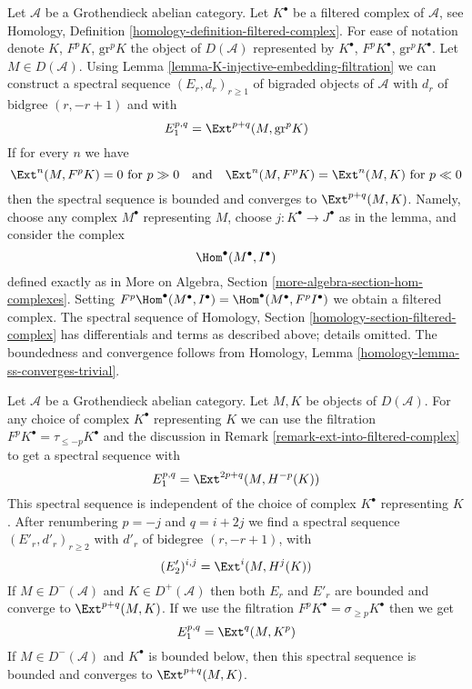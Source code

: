 \begin{remark}
\label{remark-ext-into-filtered-complex}
Let $\mathcal{A}$ be a Grothendieck abelian category.
Let $K^\bullet$ be a filtered complex of $\mathcal{A}$, see
Homology, Definition \ref{homology-definition-filtered-complex}.
For ease of notation denote $K$, $F^pK$, $\text{gr}^pK$ the
object of $D(\mathcal{A})$ represented by $K^\bullet$,
$F^pK^\bullet$, $\text{gr}^pK^\bullet$. Let $M \in D(\mathcal{A})$.
Using Lemma \ref{lemma-K-injective-embedding-filtration}
we can construct a spectral sequence $(E_r, d_r)_{r \geq 1}$
of bigraded objects of $\mathcal{A}$ with $d_r$ of bidgree
$(r, -r + 1)$ and
with
$$
E_1^{p, q} = \Ext^{p + q}(M, \text{gr}^pK)
$$
If for every $n$ we have
$$
\Ext^n(M, F^pK) = 0 \text{ for } p \gg 0
\quad\text{and}\quad
\Ext^n(M, F^pK) = \Ext^n(M, K) \text{ for } p \ll 0
$$
then the spectral sequence is bounded and converges to $\Ext^{p + q}(M, K)$.
Namely, choose any complex $M^\bullet$ representing $M$, choose
$j : K^\bullet \to J^\bullet$ as in the lemma, and consider the complex
$$
\Hom^\bullet(M^\bullet, I^\bullet)
$$
defined exactly as in
More on Algebra, Section \ref{more-algebra-section-hom-complexes}.
Setting $F^p\Hom^\bullet(M^\bullet, I^\bullet) =
\Hom^\bullet(M^\bullet, F^pI^\bullet)$ we obtain a filtered complex.
The spectral sequence of
Homology, Section \ref{homology-section-filtered-complex}
has differentials and terms as described above; details omitted.
The boundedness and convergence follows from
Homology, Lemma \ref{homology-lemma-ss-converges-trivial}.
\end{remark}

\begin{remark}
\label{remark-spectral-sequences-ext}
Let $\mathcal{A}$ be a Grothendieck abelian category.
Let $M, K$ be objects of $D(\mathcal{A})$.
For any choice of complex $K^\bullet$ representing $K$ we
can use the filtration $F^pK^\bullet = \tau_{\leq -p}K^\bullet$
and the discussion in Remark \ref{remark-ext-into-filtered-complex}
to get a spectral sequence with
$$
E_1^{p, q} = \Ext^{2p + q}(M, H^{-p}(K))
$$
This spectral sequence is independent of the choice of
complex $K^\bullet$ representing $K$. After renumbering
$p = -j$ and $q = i + 2j$ we find a spectral sequence
$(E'_r, d'_r)_{r \geq 2}$ with $d'_r$ of bidegree $(r, -r + 1)$, with
$$
(E'_2)^{i, j} = \Ext^i(M, H^j(K))
$$
If $M \in D^-(\mathcal{A})$ and $K \in D^+(\mathcal{A})$ then
both $E_r$ and $E'_r$ are bounded and converge to $\Ext^{p + q}(M, K)$.
If we use the filtration $F^pK^\bullet = \sigma_{\geq p}K^\bullet$
then we get
$$
E_1^{p, q} = \Ext^q(M, K^p)
$$
If $M \in D^-(\mathcal{A})$ and $K^\bullet$ is bounded below, then
this spectral sequence is bounded and converges to $\Ext^{p + q}(M, K)$.
\end{remark}

